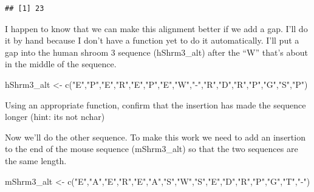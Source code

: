 \documentclass[
]{book}
\newenvironment{Shaded}{\begin{snugshade}}{\end{snugshade}}
\newcommand{\FunctionTok}[1]{\textcolor[rgb]{0.00,0.00,0.00}{#1}}
\newcommand{\NormalTok}[1]{#1}
\newcommand{\OtherTok}[1]{\textcolor[rgb]{0.56,0.35,0.01}{#1}}
\newcommand{\SpecialCharTok}[1]{\textcolor[rgb]{0.00,0.00,0.00}{#1}}
\newcommand{\StringTok}[1]{\textcolor[rgb]{0.31,0.60,0.02}{#1}}
\begin{document}
\begin{Shaded}
\end{Shaded}

\begin{verbatim}
## [1] 23
\end{verbatim}

I happen to know that we can make this alignment better if we add a gap. I'll do it by hand because I don't have a function yet to do it automatically. I'll put a gap into the human shroom 3 sequence (hShrm3\_alt) after the ``W'' that's about in the middle of the sequence.

\begin{Shaded}
\begin{Highlighting}[]
\NormalTok{hShrm3\_alt  }\OtherTok{\textless{}{-}} \FunctionTok{c}\NormalTok{(}\StringTok{"E"}\NormalTok{,}\StringTok{"P"}\NormalTok{,}\StringTok{"E"}\NormalTok{,}\StringTok{"R"}\NormalTok{,}\StringTok{"E"}\NormalTok{,}\StringTok{"P"}\NormalTok{,}\StringTok{"E"}\NormalTok{,}\StringTok{"W"}\NormalTok{,}\StringTok{"{-}"}\NormalTok{,}\StringTok{"R"}\NormalTok{,}\StringTok{"D"}\NormalTok{,}\StringTok{"R"}\NormalTok{,}\StringTok{"P"}\NormalTok{,}\StringTok{"G"}\NormalTok{,}\StringTok{"S"}\NormalTok{,}\StringTok{"P"}\NormalTok{)}
\end{Highlighting}
\end{Shaded}

Using an appropriate function, confirm that the insertion has made the sequence longer (hint: its not nchar)

Now we'll do the other sequence. To make this work we need to add an insertion to the end of the mouse sequence (mShrm3\_alt) so that the two sequences are the same length.

\begin{Shaded}
\begin{Highlighting}[]
\NormalTok{mShrm3\_alt  }\OtherTok{\textless{}{-}} \FunctionTok{c}\NormalTok{(}\StringTok{"E"}\NormalTok{,}\StringTok{"A"}\NormalTok{,}\StringTok{"E"}\NormalTok{,}\StringTok{"R"}\NormalTok{,}\StringTok{"E"}\NormalTok{,}\StringTok{"A"}\NormalTok{,}\StringTok{"S"}\NormalTok{,}\StringTok{"W"}\NormalTok{,}\StringTok{"S"}\NormalTok{,}\StringTok{"E"}\NormalTok{,}\StringTok{"D"}\NormalTok{,}\StringTok{"R"}\NormalTok{,}\StringTok{"P"}\NormalTok{,}\StringTok{"G"}\NormalTok{,}\StringTok{"T"}\NormalTok{,}\StringTok{"{-}"}\NormalTok{)}
\end{Highlighting}
\end{Shaded}
\end{document}
